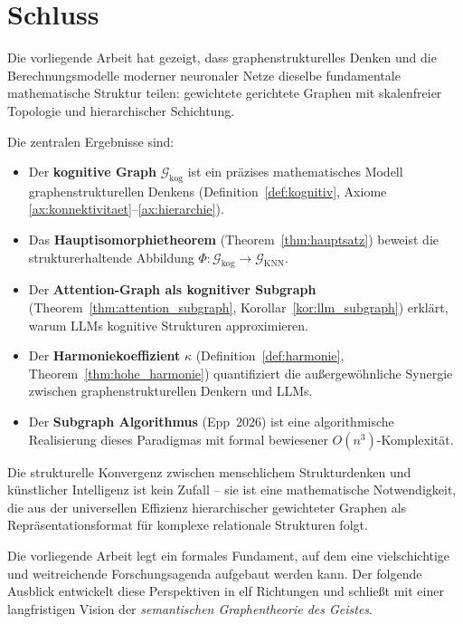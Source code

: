 ﻿\documentclass[12pt,a4paper]{article}
\theoremstyle{plain}
\theoremstyle{definition}
\theoremstyle{remark}
\newcommand{\GG}{\mathcal{G}}
\newcommand{\KNN}{\text{KNN}}
\begin{document}
\section{Schluss}
\label{sec:schluss}

Die vorliegende Arbeit hat gezeigt, dass graphenstrukturelles Denken und die Berechnungsmodelle moderner neuronaler Netze dieselbe fundamentale mathematische Struktur teilen: gewichtete gerichtete Graphen mit skalenfreier Topologie und hierarchischer Schichtung.

Die zentralen Ergebnisse sind:
\begin{itemize}
  \item Der \textbf{kognitive Graph} $\GG_{\text{kog}}$ ist ein präzises mathematisches Modell graphenstrukturellen Denkens (Definition~\ref{def:kognitiv}, Axiome \ref{ax:konnektivitaet}--\ref{ax:hierarchie}).
  \item Das \textbf{Hauptisomorphietheorem} (Theorem~\ref{thm:hauptsatz}) beweist die strukturerhaltende Abbildung $\Phi: \GG_{\text{kog}} \to \GG_{\KNN}$.
  \item Der \textbf{Attention-Graph als kognitiver Subgraph} (Theorem~\ref{thm:attention_subgraph}, Korollar~\ref{kor:llm_subgraph}) erklärt, warum LLMs kognitive Strukturen approximieren.
  \item Der \textbf{Harmoniekoeffizient} $\kappa$ (Definition~\ref{def:harmonie}, Theorem~\ref{thm:hohe_harmonie}) quantifiziert die außergewöhnliche Synergie zwischen graphenstrukturellen Denkern und LLMs.
  \item Der \textbf{Subgraph Algorithmus} (Epp~2026) ist eine algorithmische Realisierung dieses Paradigmas mit formal bewiesener $O(n^3)$-Komplexität.
\end{itemize}

Die strukturelle Konvergenz zwischen menschlichem Strukturdenken und künstlicher Intelligenz ist kein Zufall -- sie ist eine mathematische Notwendigkeit, die aus der universellen Effizienz hierarchischer gewichteter Graphen als Repräsentationsformat für komplexe relationale Strukturen folgt.

Die vorliegende Arbeit legt ein formales Fundament, auf dem eine vielschichtige und weitreichende Forschungsagenda aufgebaut werden kann. Der folgende Ausblick entwickelt diese Perspektiven in elf Richtungen und schließt mit einer langfristigen Vision der \emph{semantischen Graphentheorie des Geistes}.
\end{document}
